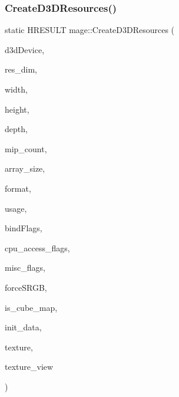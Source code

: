 \subsubsection{\texorpdfstring{Create\+D3\+D\+Resources()}{CreateD3DResources()}}
{\footnotesize\ttfamily static H\+R\+E\+S\+U\+LT mage\+::\+Create\+D3\+D\+Resources (\begin{DoxyParamCaption}\item[{\+\_\+\+In\+\_\+ I\+D3\+D11\+Device $\ast$}]{d3d\+Device,  }\item[{\+\_\+\+In\+\_\+ uint32\+\_\+t}]{res\+\_\+dim,  }\item[{\+\_\+\+In\+\_\+ size\+\_\+t}]{width,  }\item[{\+\_\+\+In\+\_\+ size\+\_\+t}]{height,  }\item[{\+\_\+\+In\+\_\+ size\+\_\+t}]{depth,  }\item[{\+\_\+\+In\+\_\+ size\+\_\+t}]{mip\+\_\+count,  }\item[{\+\_\+\+In\+\_\+ size\+\_\+t}]{array\+\_\+size,  }\item[{\+\_\+\+In\+\_\+ D\+X\+G\+I\+\_\+\+F\+O\+R\+M\+AT}]{format,  }\item[{\+\_\+\+In\+\_\+ D3\+D11\+\_\+\+U\+S\+A\+GE}]{usage,  }\item[{\+\_\+\+In\+\_\+ uint32\+\_\+t}]{bind\+Flags,  }\item[{\+\_\+\+In\+\_\+ uint32\+\_\+t}]{cpu\+\_\+access\+\_\+flags,  }\item[{\+\_\+\+In\+\_\+ uint32\+\_\+t}]{misc\+\_\+flags,  }\item[{\+\_\+\+In\+\_\+ bool}]{force\+S\+R\+GB,  }\item[{\+\_\+\+In\+\_\+ bool}]{is\+\_\+cube\+\_\+map,  }\item[{\+\_\+\+In\+\_\+reads\+\_\+opt\+\_\+(mip\+\_\+count $\ast$array\+\_\+size) D3\+D11\+\_\+\+S\+U\+B\+R\+E\+S\+O\+U\+R\+C\+E\+\_\+\+D\+A\+TA $\ast$}]{init\+\_\+data,  }\item[{\+\_\+\+Outptr\+\_\+opt\+\_\+ I\+D3\+D11\+Resource $\ast$$\ast$}]{texture,  }\item[{\+\_\+\+Outptr\+\_\+opt\+\_\+ I\+D3\+D11\+Shader\+Resource\+View $\ast$$\ast$}]{texture\+\_\+view }\end{DoxyParamCaption})\hspace{0.3cm}{\ttfamily [static]}}

\hypertarget{namespacemage_aa0bc631077bed07a8b8c27b500ded2d5}{}\label{namespacemage_aa0bc631077bed07a8b8c27b500ded2d5} 
